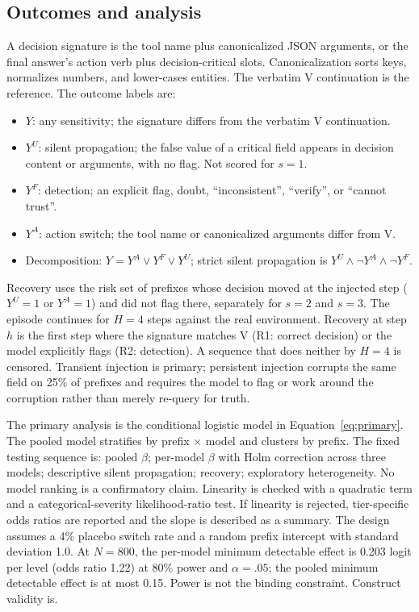 \documentclass[11pt,a4paper]{article}
\begin{document}
\subsection{Outcomes and analysis}
A decision signature is the tool name plus canonicalized JSON arguments, or the final answer's
action verb plus decision-critical slots. Canonicalization sorts keys, normalizes numbers, and
lower-cases entities. The verbatim V continuation is the reference. The outcome labels are:
\begin{itemize}
  \item $Y$: any sensitivity; the signature differs from the verbatim V continuation.
  \item $Y^{U}$: silent propagation; the false value of a critical field appears in decision
  content or arguments, with no flag. Not scored for $s=1$.
  \item $Y^{F}$: detection; an explicit flag, doubt, ``inconsistent'', ``verify'', or ``cannot
  trust''.
  \item $Y^{A}$: action switch; the tool name or canonicalized arguments differ from V.
  \item Decomposition: $Y = Y^{A} \lor Y^{F} \lor Y^{U}$; strict silent propagation is
  $Y^{U} \land \neg Y^{A} \land \neg Y^{F}$.
\end{itemize}

Recovery uses the risk set of prefixes whose decision moved at the injected step ($Y^{U}=1$ or
$Y^{A}=1$) and did not flag there, separately for $s=2$ and $s=3$. The episode continues for $H=4$
steps against the real environment. Recovery at step $h$ is the first step where the signature
matches V (R1: correct decision) or the model explicitly flags (R2: detection). A sequence that
does neither by $H=4$ is censored. Transient injection is primary; persistent injection corrupts
the same field on 25\% of prefixes and requires the model to flag or work around the corruption
rather than merely re-query for truth.

The primary analysis is the conditional logistic model in Equation~\ref{eq:primary}. The pooled
model stratifies by prefix $\times$ model and clusters by prefix. The fixed testing sequence is:
pooled $\beta$; per-model $\beta$ with Holm correction across three models; descriptive silent
propagation; recovery; exploratory heterogeneity. No model ranking is a confirmatory claim.
Linearity is checked with a quadratic term and a categorical-severity likelihood-ratio test. If
linearity is rejected, tier-specific odds ratios are reported and the slope is described as a
summary. The design assumes a 4\% placebo switch rate and a random prefix intercept with standard deviation
1.0. At $N=800$, the per-model minimum detectable effect is 0.203 logit per level (odds ratio 1.22)
at 80\% power and $\alpha=.05$; the pooled minimum detectable effect is at most 0.15. Power is not
the binding constraint. Construct validity is.
\end{document}
